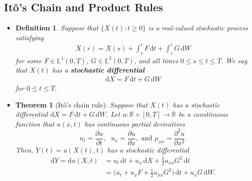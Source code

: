 \documentclass[10pt]{article}
\newtheorem{theorem}[lemma]{Theorem}
\newtheorem{definition}[lemma]{Definition}
\newcommand{\dee}{\mathrm{d}}
\newcommand{\Real}{\mathbb{R}}
\begin{document}
\subsection{It\^{o}'s Chain and Product Rules}

\begin{itemize}
  \item \begin{definition}
    Suppose that $\{ X(t) : t \geq 0 \}$ is a real-valued stochastic process satisfying
    \begin{align*}
      X(r) = X(s) + \int_s^r F\, \dee t + \int_s^r G\, \dee W
    \end{align*}
    for some $F \in \mathbb{L}^1(0,T)$, $G \in \mathbb{L}^2(0,T)$, and all times $0 \leq s \leq t \leq T$. We say that $X(t)$ has a {\bf stochastic differential}
    \begin{align*}
      \dee X = F\, \dee t + G\, \dee W
    \end{align*}
    for $0 \leq t \leq T$.
  \end{definition}

  \item \begin{theorem}[It\^{o}'s chain rule]
    Suppose that $X(t)$ has a stochastic differential $\dee X = F\, \dee t + G\, \dee W$. Let $u: \Real \times [0,T] \rightarrow \Real$ be a constinuous function that $u(x,t)$ has continuous partial derivatives $$u_t = \frac{\partial u}{\partial t},\mbox{ }u_x = \frac{\partial u}{\partial x},\mbox{ and }\mu_{xx} = \frac{\partial^2 u}{\partial x^2}.$$ Then, $Y(t) = u(X(t),t)$ has a stochastic differential 
    \begin{align*}
      \dee Y = \dee u(X,t) 
      &= u_t\,\dee t + u_x\, \dee X + \frac{1}{2} u_{xx} G^2\, \dee t \\
      &= \bigg(u_t + u_x F + \frac{1}{2}u_{xx} G^2\bigg)\, \dee t + u_x G\, \dee W.
    \end{align*}
  \end{theorem}


\end{itemize}
\end{document}
